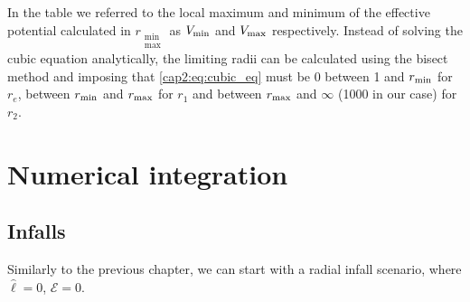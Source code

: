 In the table we referred to the local maximum and minimum of the effective
potential calculated in $r_{\substack{\text{min} \\ \text{max}}}$ as
$V_{\rm min}$ and $V_{\rm max}$ respectively.
Instead of solving the cubic equation analytically, the limiting radii can be
calculated using the bisect method and imposing that \ref{cap2:eq:cubic_eq}
must be 0 between 1 and $r_{\rm min}$ for $r_e$, between $r_{\rm min}$ and
$r_{\rm max}$ for $r_1$ and between $r_{\rm max}$ and $\infty$ (1000 in our
case) for $r_2$.

\newpage





\section{Numerical integration}

\subsection{Infalls}

Similarly to the previous chapter, we can start with a radial infall scenario,
where $\hat \ell = 0$, $\mathcal E = 0$.

